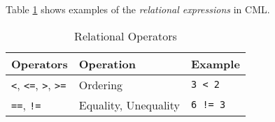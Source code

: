 Table \ref{tab:relational-expr-examples} shows
examples of the \emph{relational expressions} in CML.

\begin{table}[H]
\centering
\begin{tabular}
{ l l l }
\hline
Operators & Operation & Example \\
\hline
\verb!<!, \verb!<=!, \verb!>!, \verb!>=! & Ordering & \verb!3 < 2! \\
\verb!==!, \verb|!=| & Equality, Unequality & \verb|6 != 3|
\end{tabular}
\caption{Relational Operators}
\label{tab:relational-expr-examples}
\end{table}
